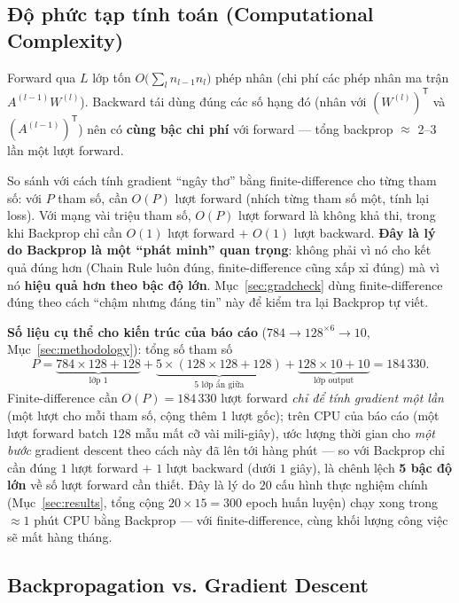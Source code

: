 \documentclass[12pt,a4paper]{report}
\newcommand{\T}{^{\mathsf{T}}}
\begin{document}
\subsection{Độ phức tạp tính toán (Computational Complexity)}
\label{sec:complexity}

Forward qua $L$ lớp tốn $O\!\big(\sum_l n_{l-1}n_l\big)$ phép nhân (chi phí
các phép nhân ma trận $A^{(l-1)}W^{(l)}$). Backward tái dùng đúng các số
hạng đó (nhân với $(W^{(l)})\T$ và $(A^{(l-1)})\T$) nên có \textbf{cùng bậc
chi phí} với forward --- tổng backprop $\approx$ 2--3 lần một lượt forward.

So sánh với cách tính gradient ``ngây thơ'' bằng finite-difference cho từng
tham số: với $P$ tham số, cần $O(P)$ lượt forward (nhích từng tham số một,
tính lại loss). Với mạng vài triệu tham số, $O(P)$ lượt forward là không
khả thi, trong khi Backprop chỉ cần $O(1)$ lượt forward $+$ $O(1)$ lượt
backward. \textbf{Đây là lý do Backprop là một ``phát minh'' quan trọng}:
không phải vì nó cho kết quả đúng hơn (Chain Rule luôn đúng, finite-difference
cũng xấp xỉ đúng) mà vì nó \textbf{hiệu quả hơn theo bậc độ lớn}. Mục~\ref{sec:gradcheck}
dùng finite-difference đúng theo cách ``chậm nhưng đáng tin'' này để kiểm tra
lại Backprop tự viết.

\textbf{Số liệu cụ thể cho kiến trúc của báo cáo} ($784\to128^{\times6}\to10$,
Mục~\ref{sec:methodology}): tổng số tham số
$$P = \underbrace{784{\times}128{+}128}_{\text{lớp 1}} + \underbrace{5\times(128{\times}128{+}128)}_{\text{5 lớp ẩn giữa}} + \underbrace{128{\times}10{+}10}_{\text{lớp output}} = 184\,330.$$
Finite-difference cần $O(P)=184\,330$ lượt forward \emph{chỉ để tính
gradient một lần} (một lượt cho mỗi tham số, cộng thêm 1 lượt gốc); trên
CPU của báo cáo (một lượt forward batch $128$ mẫu mất cỡ vài mili-giây),
ước lượng thời gian cho \emph{một bước} gradient descent theo cách này đã
lên tới hàng phút --- so với Backprop chỉ cần đúng $1$ lượt forward $+$
$1$ lượt backward (dưới $1$ giây), là chênh lệch \textbf{5 bậc độ lớn} về
số lượt forward cần thiết. Đây là lý do $20$ cấu hình thực nghiệm chính
(Mục~\ref{sec:results}, tổng cộng $20\times15=300$ epoch huấn luyện) chạy
xong trong $\approx1$ phút CPU bằng Backprop --- với finite-difference,
cùng khối lượng công việc sẽ mất hàng tháng.

\subsection{Backpropagation vs. Gradient Descent}
\label{sec:bp_vs_gd}
\end{document}
